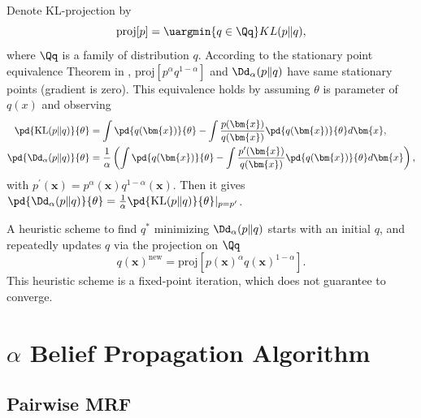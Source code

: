 Denote KL-projection by
\begin{equation}
  \text{proj}[p] = \uargmin{q \in \Qq} KL(p\|q),
\end{equation}
where $\Qq$ is a family of distribution $q$.
According to the stationary point equivalence Theorem in \cite{divergence-measures-and-message-passing}, $\text{proj}[p^{\alpha}q^{1- \alpha}]$ and $\Dd_{\alpha}(p\|q)$ have same stationary points (gradient is zero). This equivalence holds by assuming $\theta$ is parameter of $q(x)$ and observing
\begin{align}
  \pd{\mathrm{KL}(p\|q)}{\theta} &= \int \pd{q(\bm{x})}{\theta} - \int \frac{p(\bm{x})}{q(\bm{x})} \pd{q(\bm{x})}{\theta} d\bm{x}, \nonumber \\
  \pd{\mathrm{\Dd_{\alpha}}(p\|q)}{\theta} &= \frac{1}{\alpha} \left( \int \pd{q(\bm{x})}{\theta} - \int \frac{p^{\prime}(\bm{x})}{q(\bm{x})} \pd{q(\bm{x})}{\theta} d\bm{x}  \right), \nonumber
\end{align}
with $p^{\prime}(\bm{x}) = p^{\alpha}(\bm{x})q^{1-\alpha}(\bm{x})$. Then it gives $\pd{\mathrm{\Dd_{\alpha}}(p\|q)}{\theta}  = \frac{1}{\alpha}\pd{\mathrm{KL}(p\|q)}{\theta}|_{p=p^{\prime}}$.

A heuristic scheme to find $q^{\ast}$ minimizing $\Dd_{\alpha}(p\|q)$ starts with an initial $q$, and repeatedly updates $q$ via the projection on $\Qq$
\begin{equation}\label{eq:fixed-point-iter}
  q(\bm{x})^{\text{new}}  = \text{proj}[p(\bm{x})^{\alpha}q(\bm{x})^{1-\alpha}].
\end{equation}
This heuristic scheme is a fixed-point iteration, which does not guarantee to converge.


\section{$\alpha$ Belief Propagation Algorithm}\label{sec:alpha-bp-factor-refine}

\subsection{Pairwise MRF}

